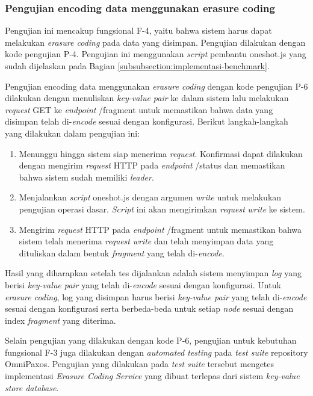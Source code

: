 \subsubsection{Pengujian encoding data menggunakan erasure coding}
\label{subsubsection:pengujian-encoding-data-erasure-coding}

Pengujian ini mencakup fungsional F-4, yaitu bahwa sistem harus dapat melakukan \textit{erasure coding} pada data yang disimpan. Pengujian dilakukan dengan kode pengujian P-4. Pengujian ini menggunakan \textit{script} pembantu oneshot.js yang sudah dijelaskan pada Bagian \ref{subsubsection:implementasi-benchmark}.

Pengujian encoding data menggunakan \textit{erasure coding} dengan kode pengujian P-6 dilakukan dengan menuliskan \textit{key-value pair} ke dalam sistem lalu melakukan \textit{request} GET ke \textit{endpoint} /fragment untuk memastikan bahwa data yang disimpan telah di-\textit{encode} sesuai dengan konfigurasi. Berikut langkah-langkah yang dilakukan dalam pengujian ini:

\begin{enumerate}
  \item Menunggu hingga sistem siap menerima \textit{request}. Konfirmasi dapat dilakukan dengan mengirim \textit{request} HTTP pada \textit{endpoint} /status dan memastikan bahwa sistem sudah memiliki \textit{leader}.
  \item Menjalankan \textit{script} oneshot.js dengan argumen \textit{write} untuk melakukan pengujian operasi dasar. \textit{Script} ini akan mengirimkan \textit{request} \textit{write} ke sistem.
  \item Mengirim \textit{request} HTTP pada \textit{endpoint} /fragment untuk memastikan bahwa sistem telah menerima \textit{request} \textit{write} dan telah menyimpan data yang dituliskan dalam bentuk \textit{fragment} yang telah di-\textit{encode}.
\end{enumerate}

Hasil yang diharapkan setelah tes dijalankan adalah sistem menyimpan \textit{log} yang berisi \textit{key-value pair} yang telah di-\textit{encode} sesuai dengan konfigurasi. Untuk \textit{erasure coding}, log yang disimpan harus berisi \textit{key-value pair} yang telah di-\textit{encode} sesuai dengan konfigurasi serta berbeda-beda untuk setiap \textit{node} sesuai dengan index \textit{fragment} yang diterima.

Selain pengujian yang dilakukan dengan kode P-6, pengujian untuk kebutuhan fungsional F-3 juga dilakukan dengan \textit{automated testing} pada \textit{test suite} repository OmniPaxos. Pengujian yang dilakukan pada \textit{test suite} tersebut mengetes implementasi \textit{Erasure Coding Service} yang dibuat terlepas dari sistem \textit{key-value store database}.